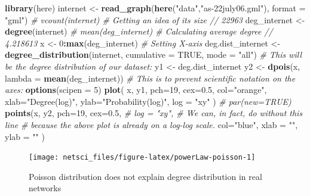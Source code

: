 \documentclass[
]{krantz}
\makeatletter
\newenvironment{Shaded}{\begin{snugshade}}{\end{snugshade}}
\newcommand{\CommentTok}[1]{\textcolor[rgb]{0.37,0.37,0.37}{\textit{#1}}}
\newcommand{\DataTypeTok}[1]{\textcolor[rgb]{0.27,0.27,0.27}{#1}}
\newcommand{\DecValTok}[1]{\textcolor[rgb]{0.06,0.06,0.06}{#1}}
\newcommand{\FloatTok}[1]{\textcolor[rgb]{0.06,0.06,0.06}{#1}}
\newcommand{\KeywordTok}[1]{\textcolor[rgb]{0.27,0.27,0.27}{\textbf{#1}}}
\newcommand{\NormalTok}[1]{#1}
\newcommand{\OperatorTok}[1]{\textcolor[rgb]{0.43,0.43,0.43}{\textbf{#1}}}
\newcommand{\OtherTok}[1]{\textcolor[rgb]{0.37,0.37,0.37}{#1}}
\newcommand{\StringTok}[1]{\textcolor[rgb]{0.5,0.5,0.5}{#1}}
\newenvironment{kframe}{%
\medskip{}
\setlength{\fboxsep}{.8em}
 \def\at@end@of@kframe{}%
 \ifinner\ifhmode%
  \def\at@end@of@kframe{\end{minipage}}%
  \begin{minipage}{\columnwidth}%
 \fi\fi%
 \def\FrameCommand##1{\hskip\@totalleftmargin \hskip-\fboxsep
 \colorbox{shadecolor}{##1}\hskip-\fboxsep
     \hskip-\linewidth \hskip-\@totalleftmargin \hskip\columnwidth}%
 \MakeFramed {\advance\hsize-\width
   \@totalleftmargin\z@ \linewidth\hsize
   \@setminipage}}%
 {\par\unskip\endMakeFramed%
 \at@end@of@kframe}
\renewenvironment{Shaded}{\begin{kframe}}{\end{kframe}}
\makeatother
\begin{document}
\begin{Shaded}
\begin{Highlighting}[]
\KeywordTok{library}\NormalTok{(here)}
\NormalTok{internet <-}\StringTok{ }\KeywordTok{read_graph}\NormalTok{(}\KeywordTok{here}\NormalTok{(}\StringTok{"data"}\NormalTok{,}\StringTok{"as-22july06.gml"}\NormalTok{), }
                       \DataTypeTok{format =} \StringTok{"gml"}\NormalTok{)}
\CommentTok{# vcount(internet) # Getting an idea of its size // 22963}
\NormalTok{deg_internet <-}\StringTok{ }\KeywordTok{degree}\NormalTok{(internet)}
\CommentTok{# mean(deg_internet) # Calculating average degree // 4.218613}
\NormalTok{x <-}\StringTok{ }\DecValTok{0}\OperatorTok{:}\KeywordTok{max}\NormalTok{(deg_internet) }\CommentTok{# Setting X-axis}
\NormalTok{deg.dist_internet <-}\StringTok{ }\KeywordTok{degree_distribution}\NormalTok{(internet, }
                                         \DataTypeTok{cumulative =} \OtherTok{TRUE}\NormalTok{, }
                                         \DataTypeTok{mode =} \StringTok{"all"}\NormalTok{)}
\CommentTok{# This will be the degree distribution of our dataset:}
\NormalTok{y1 <-}\StringTok{ }\NormalTok{deg.dist_internet }
\NormalTok{y2 <-}\StringTok{ }\KeywordTok{dpois}\NormalTok{(x, }\DataTypeTok{lambda =} \KeywordTok{mean}\NormalTok{(deg_internet))}
\CommentTok{# This is to prevent scientific notation on the axes:}
\KeywordTok{options}\NormalTok{(}\DataTypeTok{scipen =} \DecValTok{5}\NormalTok{) }
\KeywordTok{plot}\NormalTok{( x, y1, }\DataTypeTok{pch=}\DecValTok{19}\NormalTok{, }\DataTypeTok{cex=}\FloatTok{0.5}\NormalTok{, }
      \DataTypeTok{col=}\StringTok{"orange"}\NormalTok{,}
      \DataTypeTok{xlab=}\StringTok{"Degree(log)"}\NormalTok{, }
      \DataTypeTok{ylab=}\StringTok{"Probability(log)"}\NormalTok{,}
      \DataTypeTok{log =} \StringTok{"xy"}
\NormalTok{      )}
\CommentTok{# par(new=TRUE) }
\KeywordTok{points}\NormalTok{(x, y2, }\DataTypeTok{pch=}\DecValTok{19}\NormalTok{,}
     \DataTypeTok{cex=}\FloatTok{0.5}\NormalTok{,}
     \CommentTok{# log = "xy", # We can, in fact, do without this line }
     \CommentTok{# because the above plot is already on a log-log scale.}
     \DataTypeTok{col=}\StringTok{"blue"}\NormalTok{,}
     \DataTypeTok{xlab =} \StringTok{""}\NormalTok{, }
     \DataTypeTok{ylab =} \StringTok{""}
\NormalTok{     )}
\end{Highlighting}
\end{Shaded}

\begin{figure}

{\centering \texttt{[image: netsci\_files/figure-latex/powerLaw-poisson-1]} 

}

\caption{Poisson distribution does not explain degree distribution in real networks}\label{fig:powerLaw-poisson}
\end{figure}
\end{document}
